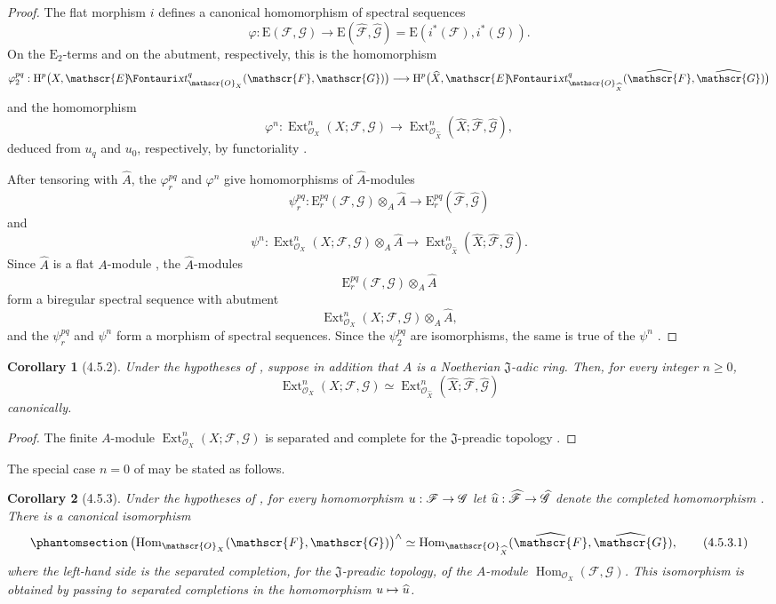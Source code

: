 \documentclass[oneside]{amsart}
\theoremstyle{ega-env-style}
\theoremstyle{ega-thm-env-style}
\newtheorem*{corollary}{Corollary}
\theoremstyle{ega-defn-env-style}
\def\mathcal{\mathscr}
\def\sh{\mathcal}                   %
\def\geq{\geqslant}                 %
\def\HH{\mathrm{H}}                 %
\def\Hom{\operatorname{Hom}}
\def\Ext{\operatorname{Ext}}
\renewcommand{\to}{\mathchoice{\longrightarrow}{\rightarrow}{\rightarrow}{\rightarrow}}
\let\mapstoo\mapsto
\renewcommand{\mapsto}{\mathchoice{\longmapsto}{\mapstoo}{\mapstoo}{\mapstoo}}
\def\isoto{\simeq} %
\renewcommand{\hat}[1]{\widehat{#1}}
\def\shExt{\sh{E}\textup{\kern-2.2pt{\Fontauri\slshape xt}}}   %
\let\EGAOriginalLabel\label
\renewcommand{\label}[1]{\phantomsection\EGAOriginalLabel{#1}}
\begin{document}
\begin{proof}
The flat morphism $i$ defines a canonical homomorphism of spectral
sequences
\[
  \varphi:\mathrm{E}(\sh{F},\sh{G})
  \longrightarrow
  \mathrm{E}(\hat{\sh{F}},\hat{\sh{G}})
  =
  \mathrm{E}(i^*(\sh{F}),i^*(\sh{G})).
\]
On the $\mathrm{E}_2$-terms and on the abutment, respectively, this
is the homomorphism
\[
  \varphi_2^{pq}:
  \HH^p\bigl(X,\shExt^q_{\sh{O}_X}(\sh{F},\sh{G})\bigr)
  \longrightarrow
  \HH^p\bigl(\hat{X},
    \shExt^q_{\sh{O}_{\hat{X}}}
      (\hat{\sh{F}},\hat{\sh{G}})\bigr)
\]
and the homomorphism
\[
  \varphi^n:
  \Ext^n_{\sh{O}_X}(X;\sh{F},\sh{G})
  \longrightarrow
  \Ext^n_{\sh{O}_{\hat{X}}}
    (\hat{X};\hat{\sh{F}},\hat{\sh{G}}),
\]
deduced from $u_q$ and $u_0$, respectively, by functoriality
.

After tensoring with $\hat{A}$, the $\varphi_r^{pq}$ and
$\varphi^n$ give homomorphisms of $\hat{A}$-modules
\[
  \psi_r^{pq}:
  \mathrm{E}_r^{pq}(\sh{F},\sh{G})\otimes_A\hat{A}
  \longrightarrow
  \mathrm{E}_r^{pq}(\hat{\sh{F}},\hat{\sh{G}})
\]
and
\[
  \psi^n:
  \Ext^n_{\sh{O}_X}(X;\sh{F},\sh{G})\otimes_A\hat{A}
  \longrightarrow
  \Ext^n_{\sh{O}_{\hat{X}}}
    (\hat{X};\hat{\sh{F}},\hat{\sh{G}}).
\]
Since $\hat{A}$ is a flat $A$-module , the
$\hat{A}$-modules
\[
  \mathrm{E}_r^{pq}(\sh{F},\sh{G})\otimes_A\hat{A}
\]
form a biregular spectral sequence with abutment
\[
  \Ext^n_{\sh{O}_X}(X;\sh{F},\sh{G})\otimes_A\hat{A},
\]
and the $\psi_r^{pq}$ and $\psi^n$ form a morphism of spectral
sequences.  Since the $\psi_2^{pq}$ are isomorphisms, the same is true
of the $\psi^n$ .
\end{proof}

\begin{corollary}[4.5.2]
\label{III.4.5.2}
Under the hypotheses of , suppose in addition that
$A$ is a Noetherian $\mathfrak J$-adic ring.  Then, for every integer
$n\geq0$,
\[
  \Ext^n_{\sh{O}_X}(X;\sh{F},\sh{G})
  \isoto
  \Ext^n_{\sh{O}_{\hat{X}}}
    (\hat{X};\hat{\sh{F}},\hat{\sh{G}})
\]
canonically.
\end{corollary}

\begin{proof}
The finite $A$-module
$\Ext^n_{\sh{O}_X}(X;\sh{F},\sh{G})$ is separated and complete for
the $\mathfrak J$-preadic topology .
\end{proof}

The special case $n=0$ of  may be stated as follows.

\begin{corollary}[4.5.3]
\label{III.4.5.3}
Under the hypotheses of , for every homomorphism
$u:\sh{F}\to\sh{G}$ let $\hat{u}:\hat{\sh{F}}\to\hat{\sh{G}}$
denote the completed homomorphism .  There is a
canonical isomorphism
\[
\label{III.4.5.3.1}
  \left(\Hom_{\sh{O}_X}(\sh{F},\sh{G})\right)^\wedge
  \isoto
  \Hom_{\sh{O}_{\hat{X}}}(\hat{\sh{F}},\hat{\sh{G}}),
  \tag{4.5.3.1}
\]
where the left-hand side is the separated completion, for the
$\mathfrak J$-preadic topology, of the $A$-module
$\Hom_{\sh{O}_X}(\sh{F},\sh{G})$.  This isomorphism is obtained by
passing to separated completions in the homomorphism
$u\mapsto\hat{u}$.
\end{corollary}
\end{document}
